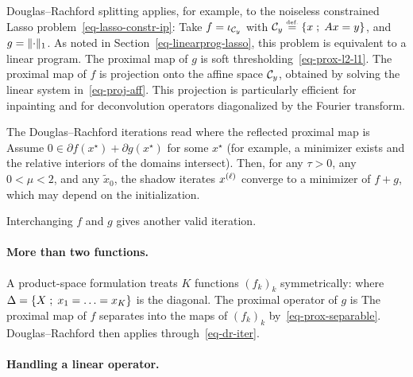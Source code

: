 \begin{exmp}
Douglas--Rachford splitting applies, for example, to the noiseless constrained Lasso problem~\eqref{eq-lasso-constr-ip}:
Take $f=\iota_{\Cc_y}$ with $\Cc_y \eqdef \enscond{x}{Ax=y}$, and $g=\norm{\cdot}_1$.
%
As noted in Section~\ref{eq-linearprog-lasso}, this problem is equivalent to a linear program.
%
The proximal map of $g$ is soft thresholding~\eqref{eq-prox-l2-l1}. The proximal map of $f$ is projection onto the affine space $\Cc_y$, obtained by solving the linear system in~\eqref{eq-proj-aff}. This projection is particularly efficient for inpainting and for deconvolution operators diagonalized by the Fourier transform.
\end{exmp}

The Douglas--Rachford iterations read
where the reflected proximal map is
Assume $0\in\partial f(x^\star)+\partial g(x^\star)$ for some $x^\star$ (for example, a minimizer exists and the relative interiors of the domains intersect). Then, for any $\tau>0$, any $0 < \mu < 2$, and any $\tilde x_0$, the shadow iterates $\it{x}$ converge to a minimizer of $f+g$, which may depend on the initialization.

Interchanging $f$ and $g$ gives another valid iteration.

\paragraph{More than two functions.}

A product-space formulation treats $K$ functions $(f_k)_k$ symmetrically:
where $\Delta=\enscond{X}{x_1=\ldots=x_K}$ is the diagonal. The proximal operator of $g$ is
The proximal map of $f$ separates into the maps of $(f_k)_k$ by~\eqref{eq-prox-separable}. Douglas--Rachford then applies through~\eqref{eq-dr-iter}.

\paragraph{Handling a linear operator.}


